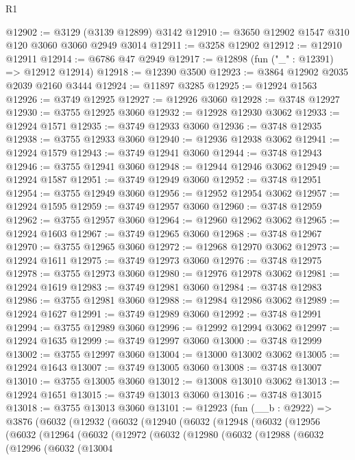 \begin{lexlean}{R1}
\begin{coremodule}
@12902 := @3129 (@3139 @12899) @3142
@12910 := @3650 @12902 @1547 @310 @120 @3060 @3060 @2949 @3014
@12911 := @3258 @12902
@12912 := @12910 @12911
@12914 := @6786 @47 @2949
@12917 := @12898 (fun ("_" : @12391) => @12912 @12914)
@12918 := @12390 @3500
@12923 := @3864 @12902 @2035 @2039 @2160 @3444
@12924 := @11897 @3285
@12925 := @12924 @1563
@12926 := @3749 @12925
@12927 := @12926 @3060
@12928 := @3748 @12927
@12930 := @3755 @12925 @3060
@12932 := @12928 @12930 @3062
@12933 := @12924 @1571
@12935 := @3749 @12933 @3060
@12936 := @3748 @12935
@12938 := @3755 @12933 @3060
@12940 := @12936 @12938 @3062
@12941 := @12924 @1579
@12943 := @3749 @12941 @3060
@12944 := @3748 @12943
@12946 := @3755 @12941 @3060
@12948 := @12944 @12946 @3062
@12949 := @12924 @1587
@12951 := @3749 @12949 @3060
@12952 := @3748 @12951
@12954 := @3755 @12949 @3060
@12956 := @12952 @12954 @3062
@12957 := @12924 @1595
@12959 := @3749 @12957 @3060
@12960 := @3748 @12959
@12962 := @3755 @12957 @3060
@12964 := @12960 @12962 @3062
@12965 := @12924 @1603
@12967 := @3749 @12965 @3060
@12968 := @3748 @12967
@12970 := @3755 @12965 @3060
@12972 := @12968 @12970 @3062
@12973 := @12924 @1611
@12975 := @3749 @12973 @3060
@12976 := @3748 @12975
@12978 := @3755 @12973 @3060
@12980 := @12976 @12978 @3062
@12981 := @12924 @1619
@12983 := @3749 @12981 @3060
@12984 := @3748 @12983
@12986 := @3755 @12981 @3060
@12988 := @12984 @12986 @3062
@12989 := @12924 @1627
@12991 := @3749 @12989 @3060
@12992 := @3748 @12991
@12994 := @3755 @12989 @3060
@12996 := @12992 @12994 @3062
@12997 := @12924 @1635
@12999 := @3749 @12997 @3060
@13000 := @3748 @12999
@13002 := @3755 @12997 @3060
@13004 := @13000 @13002 @3062
@13005 := @12924 @1643
@13007 := @3749 @13005 @3060
@13008 := @3748 @13007
@13010 := @3755 @13005 @3060
@13012 := @13008 @13010 @3062
@13013 := @12924 @1651
@13015 := @3749 @13013 @3060
@13016 := @3748 @13015
@13018 := @3755 @13013 @3060
@13101 := @12923
    (fun (__b : @2922) =>
    @3876
      (@6032
        (@12932
          (@6032
            (@12940
              (@6032
                (@12948
                  (@6032
                    (@12956
                      (@6032
                        (@12964
                          (@6032
                            (@12972
                              (@6032
                                (@12980
                                  (@6032
                                    (@12988
                                      (@6032
                                        (@12996
                                          (@6032
                                            (@13004

\end{coremodule}
\end{lexlean}
